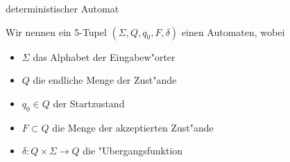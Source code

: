 \documentclass[class=article, crop=false]{standalone}
\begin{document}
\begin{zettel}{deterministischer Automat}
\begin{flashcard}[]{}
	\begin{definition}
		Wir nennen ein 5-Tupel $(\Sigma,Q, q_0,F, \delta)$ einen Automaten, wobei
		\begin{itemize}
			\item $\Sigma$ das Alphabet der Eingabew"orter
			\item $Q$ die endliche Menge der Zust"ande
			\item $q_0 \in  Q$ der Startzustand
			\item $F \subset Q$ die Menge der akzeptierten Zust"ande
			\item $\delta: Q \times \Sigma \to Q$ die "Ubergangsfunktion
		\end{itemize}
	\end{definition}
\end{flashcard}
\end{zettel}
\end{document}
